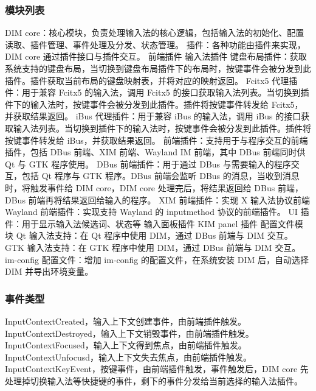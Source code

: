 \documentclass{utart}
\begin{document}
        \subsubsection{模块列表}
        \begin{outline}[enumerate]
            \1 DIM core：核心模块，负责处理输入法的核心逻辑，包括输入法的初始化、配置读取、插件管理、事件处理及分发、状态管理。
            \1 插件：各种功能由插件来实现，DIM core 通过插件接口与插件交互。
                \2 前端插件
                \2 输入法插件
                    \3 键盘布局插件：获取系统支持的键盘布局，当切换到键盘布局插件下的布局时，按键事件会被分发到此插件。插件获取当前布局的键盘映射表，并将对应的映射返回。
                    \3 Fcitx5 代理插件：用于兼容 Fcitx5 的输入法，调用 Fcitx5 的接口获取输入法列表。当切换到插件下的输入法时，按键事件会被分发到此插件。插件将按键事件转发给 Fcitx5，并获取结果返回。
                    \3 iBus 代理插件：用于兼容 iBus 的输入法，调用 iBus 的接口获取输入法列表。当切换到插件下的输入法时，按键事件会被分发到此插件。插件将按键事件转发给 iBus，并获取结果返回。
                \2 前端插件：支持用于与程序交互的前端插件，包括 DBus 前端、XIM 前端、Wayland IM 前端，其中 DBus 前端同时供 Qt 与 GTK 程序使用。
                    \3 DBus 前端插件：用于通过 DBus 与需要输入的程序交互，包括 Qt 程序与 GTK 程序。DBus 前端会监听 DBus 的消息，当收到消息时，将触发事件给 DIM core，DIM core 处理完后，将结果返回给 DBus 前端，DBus 前端再将结果返回给输入的程序。
                    \3 XIM 前端插件：实现 X 输入法协议前端
                    \3 Wayland 前端插件：实现支持 Wayland 的 inputmethod 协议的前端插件。
                \3 UI 插件：用于显示输入法候选词、状态等
                    \4 输入面板插件
                    \4 KIM panel 插件
            \1 配置文件模块
            \1 Qt 输入法支持：在 Qt 程序中使用 DIM，通过 DBus 前端与 DIM 交互。
            \1 GTK 输入法支持：在 GTK 程序中使用 DIM，通过 DBus 前端与 DIM 交互。
            \1 im-config 配置文件：增加 im-config 的配置文件，在系统安装 DIM 后，自动选择 DIM 并导出环境变量。
        \end{outline}

        \subsubsection{事件类型}
        \begin{outline}[enumerate]
            \1 InputContextCreated，输入上下文创建事件，由前端插件触发。
            \1 InputContextDestroyed，输入上下文销毁事件，由前端插件触发。
            \1 InputContextFocused，输入上下文得到焦点，由前端插件触发。
            \1 InputContextUnfocusd，输入上下文失去焦点，由前端插件触发。
            \1 InputContextKeyEvent，按键事件，由前端插件触发，事件触发后，DIM core 先处理掉切换输入法等快捷键的事件，剩下的事件分发给当前选择的输入法插件。
        \end{outline}
\end{document}
